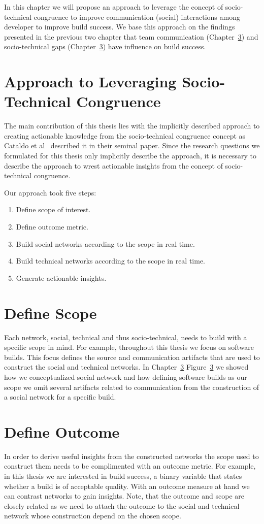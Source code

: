 \label{chap:approach}
In this chapter we will propose an approach to leverage the concept of socio-technical congruence to improve communication (social) interactions among developer to improve build success.
We base this approach on the findings presented in the previous two chapter that team communication (Chapter~\ref{}) and socio-technical gaps (Chapter~\ref{}) have influence on build success.

\section{Approach to Leveraging Socio-Technical Congruence}
The main contribution of this thesis lies with the implicitly described approach to creating actionable knowledge from the socio-technical congruence concept as Cataldo et al~\cite{cataldo:cscw:2006} described it in their seminal paper.
Since the research questions we formulated for this thesis only implicitly describe the approach, it is necessary to describe the approach to wrest actionable insights from the concept of socio-technical congruence.

Our approach took five steps:
\begin{enumerate}
\item Define scope of interest.
\item Define outcome metric.
\item Build social networks according to the scope in real time.
\item Build technical networks according to the scope in real time.
\item Generate actionable insights.
\end{enumerate}

\section{Define Scope} 
Each network, social, technical and thus socio-technical, needs to build with a specific scope in mind.
For example, throughout this thesis we focus on software builds.
This focus defines the source and communication artifacts that are used to construct the social and technical networks.
In Chapter~\ref{} Figure~\ref{} we showed how we conceptualized social network and how defining software builds as our scope we omit several artifacts related to communication from the construction of a social network for a specific build.

\section{Define Outcome}
In order to derive useful insights from the constructed networks the scope used to construct them needs to be complimented with an outcome metric.
For example, in this thesis we are interested in build success, a binary variable that states whether a build is of acceptable quality.
With an outcome measure at hand we can contrast networks to gain insights.
Note, that the outcome and scope are closely related as we need to attach the outcome to the social and technical network whose construction depend on the chosen scope.

